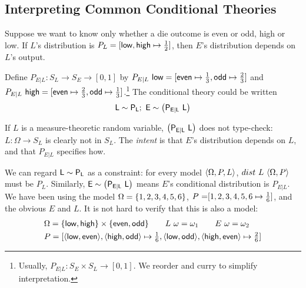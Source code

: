 \subsection{Interpreting Common Conditional Theories}

\newcommand{\CurryingNote}{Usually, $P_{E|L} : S_E \times S_L \to [0,1]$. We reorder and curry to simplify interpretation.}

\newcommand{\SimNote}{There are other ways to specify conditional distributions. We interpret ``$\sim$'' notation because we can do so unambiguously.}

\begin{example}
\label{example:conditional-theory}
Suppose we want to know only whether a die outcome is even or odd, high or low. If $L$'s distribution is $P_L = [\mathsf{low},\mathsf{high} \mapsto \tfrac{1}{2}]$, then $E$'s distribution depends on $L$'s output.

Define $P_{E|L} : S_L \to S_E \to [0,1]$ by ${P_{E|L}}\ {\mathsf{low}} = [\mathsf{even} \mapsto \tfrac{1}{3}, \mathsf{odd} \mapsto \tfrac{2}{3}]$ and ${P_{E|L}}\ {\mathsf{high}} = [\mathsf{even} \mapsto \tfrac{2}{3}, \mathsf{odd} \mapsto \tfrac{1}{3}]$.\footnote{\CurryingNote} The conditional theory could be written
\begin{equation}
	\objlang{L \sim P_L};\ \objlang{E \sim \papp {P_{E|L}} L}
\label{eqn:die-theory}
\end{equation}

If $L$ is a measure-theoretic random variable, $\mathsf{\left({P_{E|L}}\ {L}\right)}$ does not type-check: $L : \Omega \to S_L$ is clearly not in $S_L$. The \textit{intent} is that $E$'s distribution depends on $L$, and that $P_{E|L}$ specifies how.
\exampleqed
\end{example}

We can regard $\mathsf{L \sim P_L}$ as a constraint: for every model $\langle{\Omega,P,L}\rangle$, ${dist}\ {L}\ {\langle{\Omega,P}\rangle}$ must be $P_L$. Similarly, $\mathsf{E \sim \left({P_{E|L}}\ {L}\right)}$ means $E$'s conditional distribution is $P_{E|L}$. We have been using the model $\Omega = \{{1,2,3,4,5,6}\}$, ${P}\ {=} [1,2,3,4,5,6 \mapsto \tfrac{1}{6}]$, and the obvious $E$ and $L$. It is not hard to verify that this is also a model:
\begin{equation}
\begin{split}
	&\Omega = \{{\mathsf{low},\mathsf{high}}\} \times \{{\mathsf{even},\mathsf{odd}}\}
	\ \ \ \ \ \  {L}\ {\omega} = \omega_1
	\ \ \ \ \ \  {E}\ {\omega} = \omega_2 \\
	&P = [\langle{\mathsf{low},\mathsf{even}}\rangle,\langle{\mathsf{high},\mathsf{odd}}\rangle \mapsto \tfrac{1}{6}, \langle{\mathsf{low},\mathsf{odd}}\rangle,\langle{\mathsf{high},\mathsf{even}}\rangle \mapsto \tfrac{2}{6}]
\end{split}
\label{eqn:other-model}
\end{equation}

